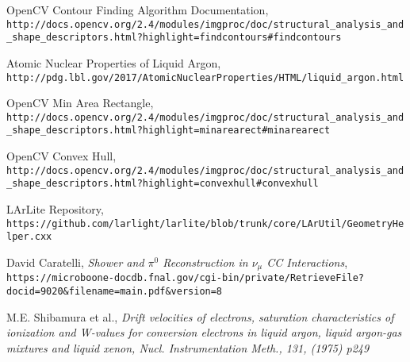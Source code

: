 \begin{thebibliography}{20}
  OpenCV Contour Finding Algorithm Documentation, \\
  \texttt{http://docs.opencv.org/2.4/modules/imgproc/doc/structural\_analysis\_and\_shape\_descriptors.html?highlight=findcontours\#findcontours}


  Atomic Nuclear Properties of Liquid Argon, \\
  \texttt{http://pdg.lbl.gov/2017/AtomicNuclearProperties/HTML/liquid\_argon.html}

  OpenCV Min Area Rectangle, \\
  \texttt{http://docs.opencv.org/2.4/modules/imgproc/doc/structural\_analysis\_and\_shape\_descriptors.html?highlight=minarearect\#minarearect}

  OpenCV Convex Hull, \\
  \texttt{http://docs.opencv.org/2.4/modules/imgproc/doc/structural\_analysis\_and\_shape\_descriptors.html?highlight=convexhull\#convexhull}

  LArLite Repository, \\
\texttt{https://github.com/larlight/larlite/blob/trunk/core/LArUtil/GeometryHelper.cxx}


  David Caratelli, \emph{Shower and $\pi^0$ Reconstruction in $\nu_{\mu}$ CC Interactions},\\
  \texttt{https://microboone-docdb.fnal.gov/cgi-bin/private/RetrieveFile?docid=9020\&filename=main.pdf\&version=8}

 M.E. Shibamura et al., \emph{Drift velocities of electrons, saturation characteristics of ionization
and W-values for conversion electrons in liquid argon, liquid argon-gas mixtures and liquid
xenon, Nucl. Instrumentation Meth., 131, (1975) p249}




\end{thebibliography}
